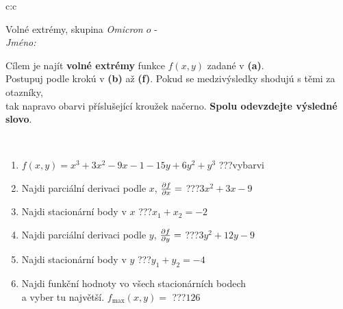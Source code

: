 \documentclass[10pt]{report}
\newcommand\omicron{o}
\begin{document}
\newpage
\thispagestyle{empty}
\begin{tabular}{c:c}
\begin{minipage}[c][104.5mm][t]{0.5\linewidth}
\begin{center}
\vspace{7mm}
{\huge Volné extrémy, skupina \textit{Omicron $\omicron$} -}\\[5mm]
\textit{Jméno:}\phantom{xxxxxxxxxxxxxxxxxxxxxxxxxxxxxxxxxxxxxxxxxxxxxxxxxxxxxxxxxxxxxxxxx}\\[5mm]
\begin{minipage}{0.95\linewidth}
\begin{center}
Cílem je najít \textbf{volné extrémy} funkce $f(x,y)$ zadané v \textbf{(a)}.\\Postupuj podle krokú v \textbf{(b)} až \textbf{(f)}. Pokud se medzivýsledky shodujú s těmi za otazníky,\\tak napravo obarvi příslušející kroužek načerno. \textbf{Spolu odevzdejte výsledné slovo}.
\end{center}
\end{minipage}
\\[1mm]
\begin{minipage}{0.79\linewidth}
\begin{center}
\begin{varwidth}{\linewidth}
\begin{enumerate}
\normalsize
\item $f(x,y)=x^3+3x^2-9x-1-15y+6y^2+y^3$\quad \dotfill\; ???\;\dotfill \quad vybarvi
\item Najdi parciální derivaci podle $x$, $\pdv{f}{x}=$\quad \dotfill\; ???\;\dotfill \quad $3x^2+3x-9$
\item Najdi stacionární body v $x$\quad \dotfill\; ???\;\dotfill \quad $x_1+x_2=-2$
\item Najdi parciální derivaci podle $y$, $\pdv{f}{y}=$\quad \dotfill\; ???\;\dotfill \quad $3y^2+12y-9$
\item Najdi stacionární body v $y$\quad \dotfill\; ???\;\dotfill \quad $y_1+y_2=-4$
\item Najdi funkční hodnoty vo všech stacionárních bodech \\ \phantom{xxxxxx} a vyber tu najvětší. $f_{\text{max}}(x,y)=$\quad \dotfill\; ???\;\dotfill \quad $126$
\end{enumerate}
\end{varwidth}
\end{center}
\end{minipage}
\begin{minipage}{0.20\linewidth}

\end{minipage}
\end{center}
\end{minipage}
\end{tabular}
\end{document}
